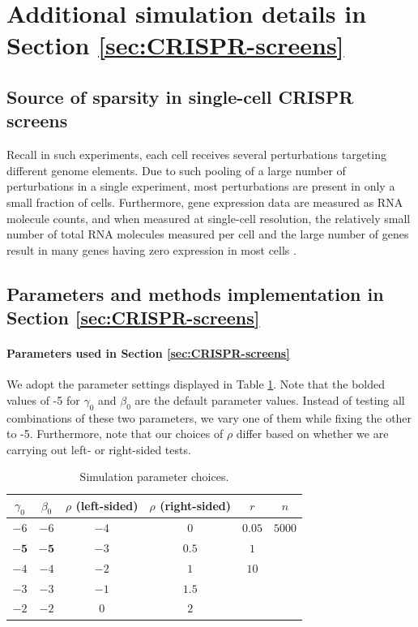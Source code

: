 \documentclass[12pt]{article}
\theoremstyle{definition}
\begin{document}
\section{Additional simulation details in Section \ref{sec:CRISPR-screens}}\label{sec:additional_details_CRISPR}



\subsection{Source of sparsity in single-cell CRISPR screens}\label{sec:source_sparsity_CRISPR}

Recall in such experiments, each cell receives several perturbations targeting different genome elements. Due to such pooling of a large number of perturbations in a single experiment, most perturbations are present in only a small fraction of cells. Furthermore, gene expression data are measured as RNA molecule counts, and when measured at single-cell resolution, the relatively small number of total RNA molecules measured per cell and the large number of genes result in many genes having zero expression in most cells \citep{Svensson2020}.

\subsection{Parameters and methods implementation in Section \ref{sec:CRISPR-screens}}\label{sec:simulation_methods_CRISPR_screens}



\paragraph{Parameters used in Section \ref{sec:CRISPR-screens}}

We adopt the parameter settings displayed in Table \ref{tab:simulation_parameter}. Note that the bolded values of -5 for $\gamma_0$ and $\beta_0$ are the default parameter values. Instead of testing all combinations of these two parameters, we vary one of them while fixing the other to -5. Furthermore, note that our choices of $\rho$ differ based on whether we are carrying out left- or right-sided tests.
\begin{table}[!h]
  \centering
  \begin{tabular}{c|c|c|c|c|c}
  $\gamma_0$ & $\beta_0$ & $\rho$ (left-sided) & $\rho$ (right-sided) & $r$ & $n$ \\
  \hline
  $-6$ & $-6$ & $-4$ & $0$ & $0.05$ & $5000$ \\
  $\bm{-5}$ & $\bm{-5}$ & $-3$ & $0.5$ & $1$ & \\
  $-4$ & $-4$ & $-2$ & $1$ & $10$ & \\
  $-3$ & $-3$ & $-1$ & $1.5$ & & \\
  $-2$ & $-2$ & $0$ & $2$ & & \\
  \end{tabular}
\caption{Simulation parameter choices.}
\label{tab:simulation_parameter}
\end{table}
\end{document}
